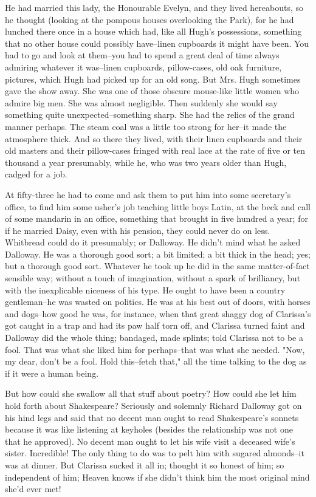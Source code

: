 \documentclass[lang=cn,10pt]{elegantbook}
\begin{document}
He had married this lady, the Honourable Evelyn, and they lived
hereabouts, so he thought (looking at the pompous houses
overlooking the Park), for he had lunched there once in a house
which had, like all Hugh's possessions, something that no other
house could possibly have--linen cupboards it might have been.  You
had to go and look at them--you had to spend a great deal of time
always admiring whatever it was--linen cupboards, pillow-cases, old
oak furniture, pictures, which Hugh had picked up for an old song.
But Mrs. Hugh sometimes gave the show away.  She was one of those
obscure mouse-like little women who admire big men.  She was
almost negligible.  Then suddenly she would say something quite
unexpected--something sharp.  She had the relics of the grand
manner perhaps.  The steam coal was a little too strong for her--it
made the atmosphere thick.  And so there they lived, with their
linen cupboards and their old masters and their pillow-cases
fringed with real lace at the rate of five or ten thousand a year
presumably, while he, who was two years older than Hugh, cadged for
a job.

At fifty-three he had to come and ask them to put him into some
secretary's office, to find him some usher's job teaching little
boys Latin, at the beck and call of some mandarin in an office,
something that brought in five hundred a year; for if he married
Daisy, even with his pension, they could never do on less.
Whitbread could do it presumably; or Dalloway.  He didn't mind what
he asked Dalloway.  He was a thorough good sort; a bit limited; a
bit thick in the head; yes; but a thorough good sort.  Whatever he
took up he did in the same matter-of-fact sensible way; without a
touch of imagination, without a spark of brilliancy, but with the
inexplicable niceness of his type.  He ought to have been a country
gentleman--he was wasted on politics.  He was at his best out of
doors, with horses and dogs--how good he was, for instance, when
that great shaggy dog of Clarissa's got caught in a trap and had
its paw half torn off, and Clarissa turned faint and Dalloway did
the whole thing; bandaged, made splints; told Clarissa not to be a
fool.  That was what she liked him for perhaps--that was what she
needed.  "Now, my dear, don't be a fool.  Hold this--fetch that,"
all the time talking to the dog as if it were a human being.

But how could she swallow all that stuff about poetry?  How could
she let him hold forth about Shakespeare?  Seriously and solemnly
Richard Dalloway got on his hind legs and said that no decent man
ought to read Shakespeare's sonnets because it was like listening
at keyholes (besides the relationship was not one that he
approved).  No decent man ought to let his wife visit a deceased
wife's sister.  Incredible!  The only thing to do was to pelt him
with sugared almonds--it was at dinner.  But Clarissa sucked it all
in; thought it so honest of him; so independent of him; Heaven
knows if she didn't think him the most original mind she'd ever
met!
\end{document}
